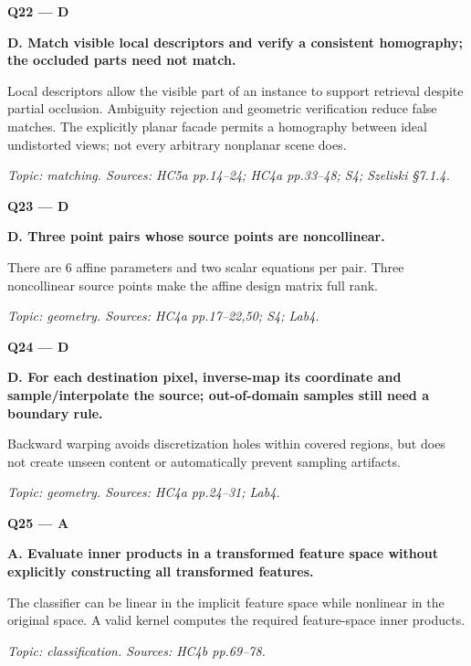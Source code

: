 \documentclass[11pt,a4paper]{article}
\begin{document}
\par\vspace{12pt}
\begin{minipage}{\linewidth}
\textbf{Q22 — D}\par\smallskip
\textbf{D. Match visible local descriptors and verify a consistent homography; the occluded parts need not match.}\par
Local descriptors allow the visible part of an instance to support retrieval despite partial occlusion. Ambiguity rejection and geometric verification reduce false matches. The explicitly planar facade permits a homography between ideal undistorted views; not every arbitrary nonplanar scene does.\par
{\small\itshape Topic: matching. Sources: HC5a pp.14–24; HC4a pp.33–48; S4; Szeliski §7.1.4.}

\end{minipage}
\par\vspace{12pt}
\begin{minipage}{\linewidth}
\textbf{Q23 — D}\par\smallskip
\textbf{D. Three point pairs whose source points are noncollinear.}\par
There are 6 affine parameters and two scalar equations per pair. Three noncollinear source points make the affine design matrix full rank.\par
{\small\itshape Topic: geometry. Sources: HC4a pp.17–22,\allowbreak{}50; S4; Lab4.}

\end{minipage}
\par\vspace{12pt}
\begin{minipage}{\linewidth}
\textbf{Q24 — D}\par\smallskip
\textbf{D. For each destination pixel,\allowbreak{} inverse-map its coordinate and sample/\allowbreak{}interpolate the source; out-of-domain samples still need a boundary rule.}\par
Backward warping avoids discretization holes within covered regions,\allowbreak{} but does not create unseen content or automatically prevent sampling artifacts.\par
{\small\itshape Topic: geometry. Sources: HC4a pp.24–31; Lab4.}

\end{minipage}
\par\vspace{12pt}
\begin{minipage}{\linewidth}
\textbf{Q25 — A}\par\smallskip
\textbf{A. Evaluate inner products in a transformed feature space without explicitly constructing all transformed features.}\par
The classifier can be linear in the implicit feature space while nonlinear in the original space. A valid kernel computes the required feature-space inner products.\par
{\small\itshape Topic: classification. Sources: HC4b pp.69–78.}

\end{minipage}
\end{document}
